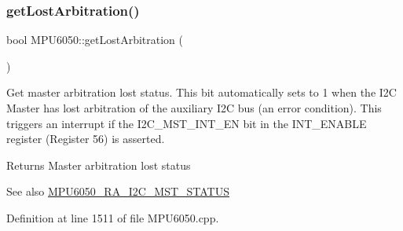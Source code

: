 \begin{DoxyCode}{0}

\end{DoxyCode}
\mbox{\label{classMPU6050_acd775c72f85dabfc6f8fba43da096c6d}} 
\subsubsection{\texorpdfstring{getLostArbitration()}{getLostArbitration()}}
{\footnotesize\ttfamily bool M\+P\+U6050\+::get\+Lost\+Arbitration (\begin{DoxyParamCaption}{ }\end{DoxyParamCaption})}

Get master arbitration lost status. This bit automatically sets to 1 when the I2C Master has lost arbitration of the auxiliary I2C bus (an error condition). This triggers an interrupt if the I2\+C\+\_\+\+M\+S\+T\+\_\+\+I\+N\+T\+\_\+\+EN bit in the I\+N\+T\+\_\+\+E\+N\+A\+B\+LE register (Register 56) is asserted. \begin{DoxyReturn}{Returns}
Master arbitration lost status 
\end{DoxyReturn}
\begin{DoxySeeAlso}{See also}
\mbox{\hyperlink{MPU6050_8h_a5ef54580f436c198fb84d01288fbef49}{M\+P\+U6050\+\_\+\+R\+A\+\_\+\+I2\+C\+\_\+\+M\+S\+T\+\_\+\+S\+T\+A\+T\+US}} 
\end{DoxySeeAlso}


Definition at line 1511 of file M\+P\+U6050.\+cpp.


